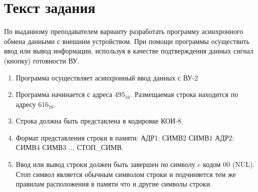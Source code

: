 \documentclass{article}
\begin{document}
\itmo[
  variant=1111,
  labn=5,
  discipline=Основы профессиональной деятельности,
  group=P3115,
  student=Владимир Мацюк,
  teacher=Абузов Ярослав Александрович,
  logo=../../../lib/img/itmo.png
]

\section{Текст задания}
По выданному преподавателем варианту разработать программу асинхронного обмена данными с внешним устройством. При помощи программы осуществить ввод или вывод информации, используя в качестве подтверждения данных сигнал (кнопку) готовности ВУ.
\begin{enumerate}
  \item Программа осуществляет асинхронный ввод данных с ВУ-2
  \item Программа начинается с адреса $495_{16}$. Размещаемая строка находится по адресу $616_{16}$.
  \item Строка должна быть представлена в кодировке КОИ-8.
  \item Формат представления строки в памяти: АДР1: СИМВ2 СИМВ1 АДР2: СИМВ4 СИМВ3 ... СТОП\_СИМВ.
  \item Ввод или вывод строки должен быть завершен по символу c кодом 00 (NUL). Стоп символ является обычным символом строки и подчиняется тем же правилам расположения в памяти что и другие символы строки.
\end{enumerate}
\end{document}
